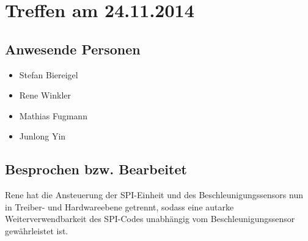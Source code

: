 \chapter{Treffen am 24.11.2014}
\section{Anwesende Personen}
\begin{itemize}
	\item Stefan Biereigel
	\item Rene Winkler
	\item Mathias Fugmann
	\item Junlong Yin
\end{itemize}

\section{Besprochen bzw. Bearbeitet}
Rene hat die Ansteuerung der SPI-Einheit und des Beschleunigungssensors nun in Treiber- und Hardwareebene getrennt, sodass eine autarke Weiterverwendbarkeit des SPI-Codes unabhängig vom Beschleunigungssensor gewährleistet ist.
